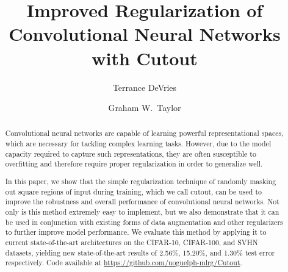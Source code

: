 \documentclass[10pt,twocolumn,letterpaper]{article}
\begin{document}
\title{Improved Regularization of Convolutional Neural Networks with Cutout}


\author[1]{Terrance DeVries}
\author[1,2]{Graham W.~Taylor}

\maketitle

\begin{abstract}
Convolutional neural networks are capable of learning powerful representational spaces, which are necessary for tackling complex learning tasks. However, due to the model capacity required to capture such representations, they are often susceptible to overfitting and therefore require proper regularization in order to generalize well.

In this paper, we show that the simple regularization technique of randomly masking out square regions of input during training, which we call cutout, can be used to improve the robustness and overall performance of convolutional neural networks.
Not only is this method extremely easy to implement, but we also demonstrate that it can be used in conjunction with existing forms of data augmentation and other regularizers to further improve model performance. We evaluate this method by applying it to current state-of-the-art architectures on the CIFAR-10, CIFAR-100, and SVHN datasets, yielding new state-of-the-art results of 2.56\%, 15.20\%, and 1.30\% test error respectively. %
Code available at \url{https://github.com/uoguelph-mlrg/Cutout}.

\end{abstract}
\end{document}
